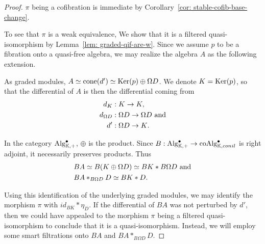 \documentclass[../thesis.tex]{subfiles}
\begin{document}
            \begin{proof}
                $\pi$ being a cofibration is immediate by Corollary~\ref{cor: stable-cofib-base-change}. 
                
                To see that $\pi$ is a weak equivalence, We show that it is a filtered quasi-isomorphism by Lemma~\ref{lem: graded-qif-are-w}. Since we assume $p$ to be a fibration onto a quasi-free algebra, we may realize the algebra $A$ as the following extension.
                \begin{center}
                \end{center}
                As graded modules, $A \simeq \tt{cone}(d') \simeq \tt{Ker}(p) \oplus \Omega D$. We denote $K = \tt{Ker}(p)$, so that the differential of $A$ is then the differential coming from 
                \begin{align*}
                    d_K & : K \rightarrow K, \\
                    d_{\Omega D} & : \Omega D \rightarrow \Omega D \tt{ and} \\
                    d' & : \Omega D \rightarrow K\tt{.}
                \end{align*}

                In the category $\tt{Alg}_{\mathbb{K},+}^\bullet$, $\oplus$ is the product. Since $B : \tt{Alg}_{\mathbb{K},+}^\bullet \rightarrow \tt{coAlg}_{\mathbb{K}, conil}^\bullet$ is right adjoint, it necessarily preserves products. Thus
                \begin{align*}
                    & BA\simeq B(K\oplus \Omega D) \simeq BK \ast B\Omega D \tt{ and} \\
                    & BA \ast_{B\Omega D} D \simeq BK \ast D\tt{.}
                \end{align*}
                
                Using this identification of the underlying graded modules, we may identify the morphism $\pi$ with $id_{BK} \ast \eta_D$. If the differential of $BA$ was not perturbed by $d'$, then we could have appealed to the morphism $\pi$ being a filtered quasi-isomorphism to conclude that it is a quasi-isomorphism. Instead, we will employ some smart filtrations onto $BA$ and $BA \ast_{B\Omega D}D$.


\end{proof}
\end{document}
